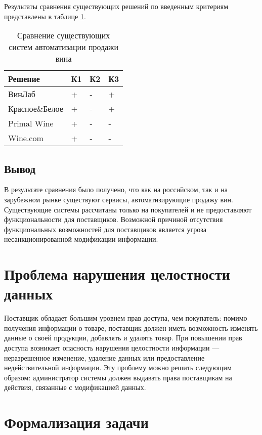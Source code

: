 Результаты сравнения существующих решений по введенным критериям представлены в таблице \ref{tab:comparison}.

\begin{table}[h]
    \caption{Сравнение существующих систем автоматизации продажи вина}
    \begin{center}
        \begin{tabular}{|l|l|l|l|}
            \hline
            \textbf{Решение} & \textbf{К1} & \textbf{К2} & \textbf{К3} \\ \hline
            ВинЛаб & + & - & + \\ \hline
            Красное\&Белое & + & - & + \\ \hline
            Primal Wine & + & - & - \\ \hline
            Wine.com & + & - & - \\ \hline
        \end{tabular}
    \end{center}
    \label{tab:comparison}
\end{table}

\subsection*{Вывод}

В результате сравнения было получено, что как на российском, так и на зарубежном рынке существуют сервисы, автоматизирующие продажу вин. Существующие системы рассчитаны только на покупателей и не предоставляют функциональности для поставщиков. Возможной причиной отсутствия функциональных возможностей для поставщиков является угроза несанкционированной модификации информации.

\section{Проблема нарушения целостности данных}

Поставщик обладает большим уровнем прав доступа, чем покупатель: помимо получения информации о товаре, поставщик должен иметь возможность изменять данные о своей продукции, добавлять и удалять товар. При повышении прав доступа возникает опасность нарушения целостности информации --- неразрешенное изменение, удаление данных или предоставление недействительной информации. Эту проблему можно решить следующим образом: администратор системы должен выдавать права поставщикам на действия, связанные с модификацией данных.

\section{Формализация задачи}

